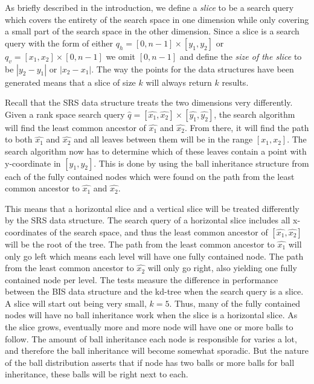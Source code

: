 As briefly described in the introduction, we define a \emph{slice} to be a search query which covers the entirety of the search space in one dimension while only covering a small part of the search space in the other dimension. Since a slice is a search query with the form of either $q_h = [0, n-1] \times [y_1, y_2]$ or $q_v = [x_1, x_2] \times [0, n-1]$ we omit $[0, n-1]$ and define the \emph{size of the slice} to be $\left| y_2-y_1\right|$ or $\left|x_2-x_1\right|$. The way the points for the data structures have been generated means that a slice of size $k$ will always return $k$ results.

Recall that the SRS data structure treats the two dimensions very differently. Given a rank space search query $\hat{q} = [\hat{x_1}, \hat{x_2}] \times [\hat{y_1}, \hat{y_2}]$, the search algorithm will find the least common ancestor of $\hat{x_1}$ and $\hat{x_2}$. From there, it will find the path to both $\hat{x_1}$ and $\hat{x_2}$ and all leaves between them will be in the range $[x_1, x_2]$. The search algorithm now has to determine which of these leaves contain a point with y-coordinate in $[y_1, y_2]$. This is done by using the ball inheritance structure from each of the fully contained nodes which were found on the path from the least common ancestor to $\hat{x_1}$ and $\hat{x_2}$.

This means that a horizontal slice and a vertical slice will be treated differently by the SRS data structure. The search query of a horizontal slice includes all x-coordinates of the search space, and thus the least common ancestor of $[\hat{x_1}, \hat{x_2}]$ will be the root of the tree. The path from the least common ancestor to $\hat{x_1}$ will only go left which means each level will have one fully contained node. The path from the least common ancestor to $\hat{x_2}$ will only go right, also yielding one fully contained node per level. The tests measure the difference in performance between the BIS data structure and the kd-tree when the search query is a slice. A slice will start out being very small, $k=5$. Thus, many of the fully contained nodes will have no ball inheritance work when the slice is a horizontal slice. As the slice grows, eventually more and more node will have one or more balls to follow. The amount of ball inheritance each node is responsible for varies a lot, and therefore the ball inheritance will become somewhat sporadic. But the nature of the ball distribution asserts that if node has two balls or more balls for ball inheritance, these balls will be right next to each.

